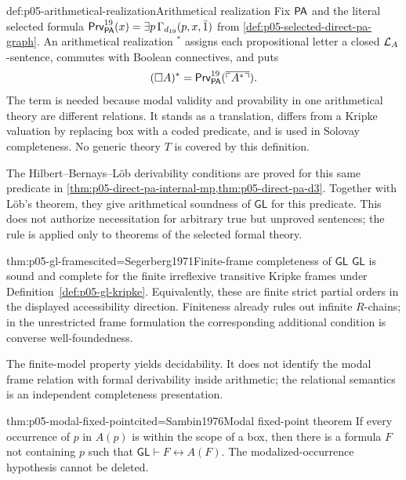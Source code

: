 \begin{hbdefinition}{def:p05-arithmetical-realization}{Arithmetical realization}
Fix \(\mathsf{PA}\) and the literal selected formula
\(\mathsf{Prv}^{19}_{\mathsf{PA}}(x)=\exists p\,\Gamma_{d_{19}}(p,x,\bar1)\)
from \cref{def:p05-selected-direct-pa-graph}. An arithmetical
realization \(^*\) assigns each propositional letter a closed
\(\mathcal{L}_A\)-sentence, commutes with Boolean connectives, and puts
\[
 (\Box A)^*=\mathsf{Prv}^{19}_{\mathsf{PA}}
   (\overline{\ulcorner A^*\urcorner}).
\]
The term is needed because modal validity and provability in one arithmetical
theory are different relations.  It stands as a translation, differs from a
Kripke valuation by replacing box with a coded predicate, and is used in
Solovay completeness.  No generic theory \(T\) is covered by this definition.
\end{hbdefinition}

The Hilbert--Bernays--L\"ob derivability conditions are proved for this
same predicate in
\cref{thm:p05-direct-pa-internal-mp,thm:p05-direct-pa-d3}. Together with
L\"ob's theorem, they give arithmetical soundness of \(\mathsf{GL}\)
for this predicate.
This does not authorize
necessitation for arbitrary true but unproved sentences; the rule is applied
only to theorems of the selected formal theory.

\begin{hbtheorem}{thm:p05-gl-frames}{cited=Segerberg1971}{Finite-frame completeness of \(\mathsf{GL}\)}
\(\mathsf{GL}\) is sound and complete for the finite irreflexive transitive
Kripke frames under Definition~\ref{def:p05-gl-kripke}.  Equivalently, these
are finite strict partial orders in the displayed accessibility direction.
Finiteness already rules out infinite \(R\)-chains; in the unrestricted frame
formulation the corresponding additional condition is converse
well-foundedness.
\end{hbtheorem}

The finite-model property yields decidability.  It does not identify the modal
frame relation with formal derivability inside arithmetic; the relational
semantics is an independent completeness presentation.

\begin{hbtheorem}{thm:p05-modal-fixed-point}{cited=Sambin1976}{Modal fixed-point theorem}
If every occurrence of \(p\) in \(A(p)\) is within the scope of a box, then
there is a formula \(F\) not containing \(p\) such that
\(\mathsf{GL}\vdash F\leftrightarrow A(F)\).  The modalized-occurrence
hypothesis cannot be deleted.
\end{hbtheorem}

